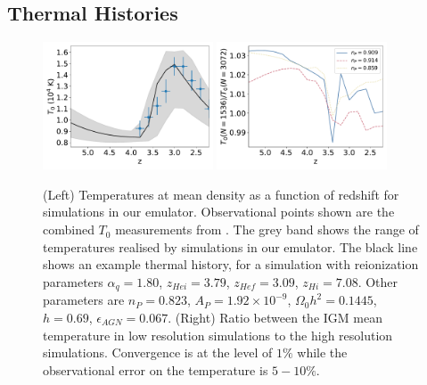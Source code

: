 \documentclass[a4paper,11pt]{article}
\newcommand{\spb}[1]{{\textcolor{magenta}{[{\bf SPB}: #1]}}}
\begin{document}


\subsection{Thermal Histories}
\label{sec:thermal}

\begin{figure}
\includegraphics[width=0.45\textwidth]{figures/mean-temperature.pdf}
\includegraphics[width=0.45\textwidth]{figures/mean-temperature-resolution.pdf}
 \caption{(Left) Temperatures at mean density as a function of redshift for simulations in our emulator. Observational points shown are the combined $T_0$ measurements from \protect\cite{Gaikwad:2021}.  The grey band shows the range of temperatures realised by simulations in our emulator. The black line shows an example thermal history, for a simulation with reionization parameters $\alpha_q = 1.80$, $z_{Hei} = 3.79$, $z_{Hef} = 3.09$, $z_{Hi} = 7.08$. Other parameters are $n_P = 0.823$, $A_P = 1.92 \times 10^{-9}$, $\Omega_0 h^2 = 0.1445$, $h = 0.69$, $\epsilon_{AGN} = 0.067$.
 (Right) Ratio between the IGM mean temperature in low resolution simulations to the high resolution simulations. Convergence is at the level of $1\%$ while the observational error on the temperature is $5-10\%$.
}
 \label{fig:meanigmtempdens}
\end{figure}
\end{document}
